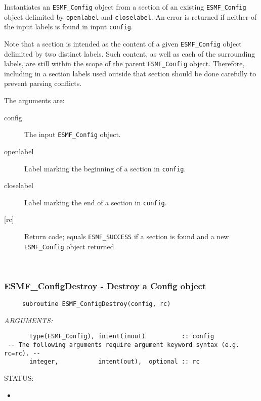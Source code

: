      Instantiates an {\tt ESMF\_Config} object from a section of an existing
     {\tt ESMF\_Config} object delimited by {\tt openlabel} and {\tt closelabel}.
     An error is returned if neither of the input labels is found in input
     {\tt config}.
  
     Note that a section is intended as the content of a given {\tt ESMF\_Config}
     object delimited by two distinct labels. Such content, as well as each of the
     surrounding labels, are still within the scope of the parent {\tt ESMF\_Config}
     object. Therefore, including in a section labels used outside that
     section should be done carefully to prevent parsing conflicts.
  
     The arguments are:
     \begin{description}
       \item[config]
         The input {\tt ESMF\_Config} object.
       \item[openlabel]
         Label marking the beginning of a section in {\tt config}.
       \item[closelabel]
         Label marking the end of a section in {\tt config}.
       \item [{[rc]}]
         Return code; equals {\tt ESMF\_SUCCESS} if a section is found
        and a new {\tt ESMF\_Config} object returned.
     \end{description}
   
 
\mbox{}\hrulefill\ 
 

  \subsubsection [ESMF\_ConfigDestroy] {ESMF\_ConfigDestroy - Destroy a Config object}


  
\begin{verbatim}     subroutine ESMF_ConfigDestroy(config, rc)
 \end{verbatim}{\em ARGUMENTS:}
\begin{verbatim}       type(ESMF_Config), intent(inout)          :: config
 -- The following arguments require argument keyword syntax (e.g. rc=rc). --
       integer,           intent(out),  optional :: rc\end{verbatim}
{\sf STATUS:}
   \begin{itemize}
   \item{}
   \end{itemize}
  
